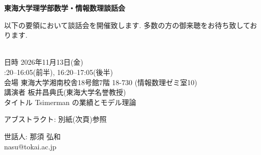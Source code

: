 \documentclass[12pt,dvipdfmx]{jarticle}
\begin{document}
\begin{center}
 {\bf \Huge 東海大学理学部数学・情報数理談話会}
\end{center}

{\Large 以下の要領において談話会を開催致します. 多数の方の御来聴をお待ち致しております. 
\begin{tabbing}
\hspace{2.5cm} \=  \\
\noindent
日時 \> 2026年11月13日(金) \\
:20--16:05(前半), 16:20--17:05(後半) \\
\noindent
会場 \> 東海大学湘南校舎18号館7階 18-730 (情報数理ゼミ室10) \\
\noindent
講演者 \> 板井昌典氏(東海大学名誉教授) \\
\noindent
タイトル \> Tsimerman の業績とモデル理論 \\
\end{tabbing}

\noindent
アブストラクト: 別紙(次頁)参照

\begin{flushright}
  世話人: 那須 弘和\\
  nasu@tokai.ac.jp
\end{flushright}
}


\newpage


\end{document}
